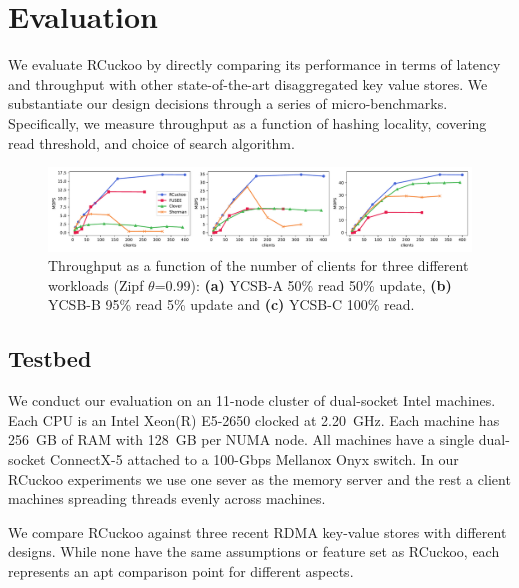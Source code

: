 \section{Evaluation}
\label{sec:eval}

We evaluate RCuckoo by directly comparing its performance in terms of
latency and throughput with other state-of-the-art disaggregated key
value stores. We substantiate our design decisions through a series of
micro-benchmarks. Specifically, we measure throughput as a function of
hashing locality, covering read threshold, and choice of search
algorithm.



\begin{figure}[ht]
    \includegraphics[width=0.99\linewidth]{fig/hero_ycsb_throughput.pdf}

    \caption{Throughput as a function of the number of clients for three different workloads (Zipf $\theta$=0.99): \textbf{(a)} YCSB-A 50\%
    read 50\% update, \textbf{(b)} YCSB-B 95\% read 5\% update and \textbf{(c)}
    YCSB-C 100\% read.}
    \label{fig:ycsb_throughput}
 \end{figure}


\subsection{Testbed}

We conduct our evaluation on an 11-node cluster of dual-socket Intel
machines. Each CPU is an Intel Xeon(R) E5-2650 clocked at
2.20~GHz. Each machine has 256~GB of RAM with 128~GB per NUMA
node. All machines have a single dual-socket ConnectX-5 attached to a
100-Gbps Mellanox Onyx switch. In our RCuckoo experiments we use one
sever as the memory server and the rest a client machines
spreading threads evenly across machines.


We compare RCuckoo against three recent RDMA key-value stores with
different designs.  While none have the same assumptions or feature
set as RCuckoo, each represents an apt comparison point for different
aspects.


